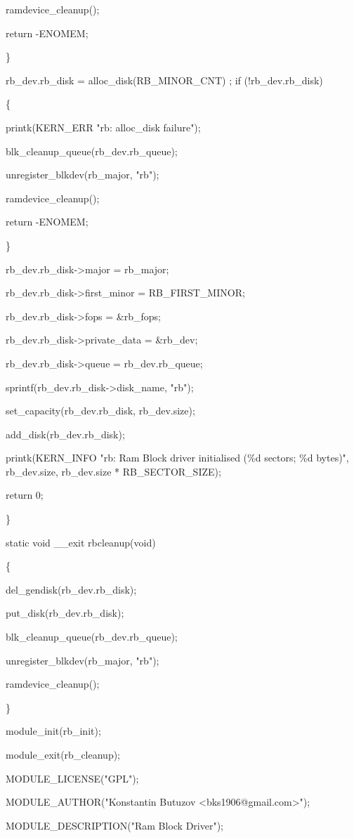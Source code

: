 \documentclass[11pt]{article}
\begin{document}
		ramdevice\_cleanup();
		
		return -ENOMEM;
		
	\}
	
	rb\_dev.rb\_disk = alloc\_disk(RB\_MINOR\_CNT)
	;
	if (!rb\_dev.rb\_disk)
	
	\{
	
		printk(KERN\_ERR "rb: alloc\_disk failure\n");
		
		blk\_cleanup\_queue(rb\_dev.rb\_queue);
		
		unregister\_blkdev(rb\_major, "rb");
		
		ramdevice\_cleanup();
		
		return -ENOMEM;
		
	\}

	rb\_dev.rb\_disk->major = rb\_major;
	
	rb\_dev.rb\_disk->first\_minor = RB\_FIRST\_MINOR;
	
	rb\_dev.rb\_disk->fops = &rb\_fops;
	
	rb\_dev.rb\_disk->private\_data = &rb\_dev;
	
	rb\_dev.rb\_disk->queue = rb\_dev.rb\_queue;
	
	sprintf(rb\_dev.rb\_disk->disk\_name, "rb");
	
	set\_capacity(rb\_dev.rb\_disk, rb\_dev.size);
	
	add\_disk(rb\_dev.rb\_disk);
	
	printk(KERN\_INFO "rb: Ram Block driver initialised (\%d sectors; \%d bytes)\n",
		rb\_dev.size, rb\_dev.size * RB\_SECTOR\_SIZE);

	return 0;
	
\}

static void \_\_exit rbcleanup(void)

\{

	del\_gendisk(rb\_dev.rb\_disk);
	
	put\_disk(rb\_dev.rb\_disk);
	
	blk\_cleanup\_queue(rb\_dev.rb\_queue);
	
	unregister\_blkdev(rb\_major, "rb");
	
	ramdevice\_cleanup();
	
\}

module\_init(rb\_init);

module\_exit(rb\_cleanup);

MODULE\_LICENSE("GPL");

MODULE\_AUTHOR("Konstantin Butuzov <bks1906@gmail.com>");

MODULE\_DESCRIPTION("Ram Block Driver");
\end{document}
